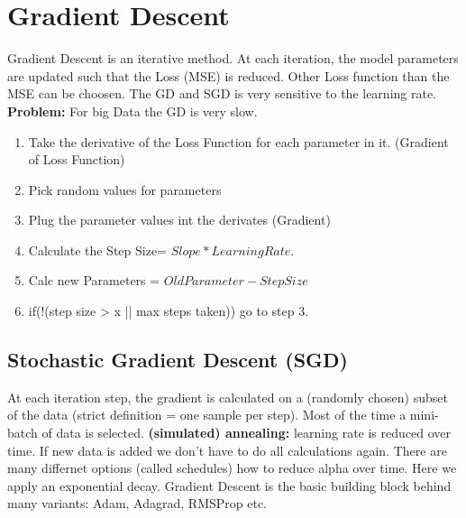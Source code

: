 \section{Gradient Descent}
Gradient Descent is an iterative method. At each iteration, the model parameters are updated such that the Loss (MSE) is reduced. Other Loss function than the MSE can be choosen. The GD and SGD is very sensitive to the learning rate. \textbf{Problem:} For big Data the GD is very slow.
\begin{enumerate}[topsep=0pt]
  \itemsep -0.5em
  \item Take the derivative of the Loss Function for each parameter in it. (Gradient of Loss Function)
  \item Pick random values for parameters
  \item Plug the parameter values int the derivates (Gradient)
  \item Calculate the Step Size= $Slope * Learning Rate$.
  \item Calc new Parameters = $Old Parameter - Step Size$
  \item if(!(step size > x || max steps taken)) go to step 3.
\end{enumerate}

\subsection{Stochastic Gradient Descent (SGD)}
At each iteration step, the gradient is calculated on a (randomly chosen) subset of the data (strict definition = one sample per step). Most of the time a mini-batch of data is selected. \textbf{(simulated) annealing:} learning rate is reduced over time. If new data is added we don't have to do all calculations again. There are many differnet options (called schedules) how to reduce alpha over time. Here we apply an exponential decay. Gradient Descent is the basic building block behind many variants: Adam, Adagrad, RMSProp etc.
